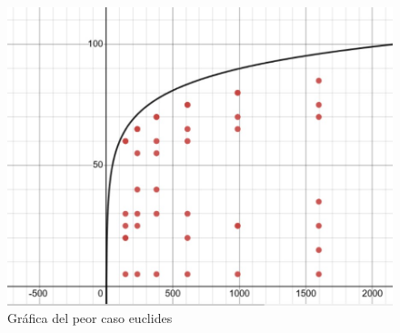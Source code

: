 \documentclass[12pt,twoside]{article}
\begin{document}
\begin{figure}[h!]
\centering
\includegraphics[scale=0.7]{peor_caso_euclides.jpg}
\caption{Gráfica del peor caso euclides}
\label{fig:universe}
\end{figure}

\clearpage
\end{document}

